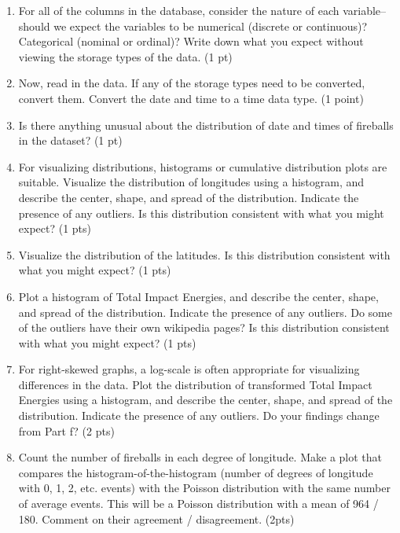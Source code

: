 \documentclass[]{book}
\theoremstyle{definition}
\begin{document}
\begin{enumerate}
\begin{enumerate} [label=\alph*]
\item For all of the columns in the database, consider the nature of each variable–should we expect the variables to be numerical (discrete or continuous)? Categorical (nominal or ordinal)? Write down what you expect without viewing the storage types of the data. (1 pt)
\item  Now, read in the data.  If any of the storage types need to be converted, convert them.  Convert the date and time to a time data type. (1 point)
\item  Is there anything unusual about the distribution of date and times of fireballs in the dataset? (1 pt)
\item  For visualizing distributions, histograms or cumulative distribution plots are suitable. Visualize the distribution of longitudes using a histogram, and describe the center, shape, and spread of the distribution. Indicate the presence of any outliers. Is this distribution consistent with what you might expect? (1 pts)
\item  Visualize the distribution of the latitudes.  Is this distribution consistent with what you might expect? (1 pts)
\item  Plot a histogram of Total Impact Energies, and describe the center, shape, and spread of the distribution. Indicate the presence of any outliers.  Do some of the outliers have their own wikipedia pages?  Is this distribution consistent with what you might expect? (1 pts)
\item  For right-skewed graphs, a log-scale is often appropriate for visualizing differences in the data. Plot the distribution of transformed Total Impact Energies using a histogram, and describe the center, shape, and spread of the distribution. Indicate the presence of any outliers. Do your findings change from Part f? (2 pts)
\item Count the number of fireballs in each degree of longitude.  Make a plot that compares the histogram-of-the-histogram (number of degrees of longitude with 0, 1, 2, etc.  events)  with the Poisson distribution with the same number of average events.    This will be a Poisson distribution with a mean of 964 / 180.  Comment on their agreement / disagreement. (2pts)

\end{enumerate}



\end{enumerate}
\end{document}
